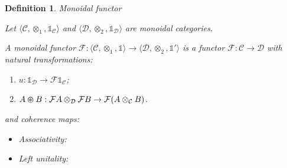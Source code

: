 \documentclass[a4paper]{article}
\newtheorem{defin}{Definition}
\begin{document}
\begin{defin} Monoidal functor

  Let $\langle \mathcal{C}, \otimes_1, \mathds{1}_{\mathcal{C}} \rangle$ and $\langle \mathcal{D}, \otimes_2, \mathds{1}_{\mathcal{D}} \rangle$ are monoidal categories.

  A monoidal functor $\mathcal{F} : \langle \mathcal{C}, \otimes_1, \mathds{1} \rangle \to \langle \mathcal{D}, \otimes_2, \mathds{1}' \rangle$ is a functor
  $\mathcal{F} : \mathcal{C} \to \mathcal{D}$ with natural transformations:

  \begin{enumerate}
  \item $u : \mathds{1}_{\mathcal{D}} \to \mathcal{F}\mathds{1}_{\mathcal{C}}$;
  \item $A \varoast B : \mathcal{F}A \otimes_{\mathcal{D}} \mathcal{F}B \to \mathcal{F}(A \otimes_{\mathcal{C}} B)$.
\end{enumerate}

  and coherence maps:

  \begin{itemize}
    \item Associativity:


    \item Left unitality:



\end{itemize}
\end{defin}
\end{document}
